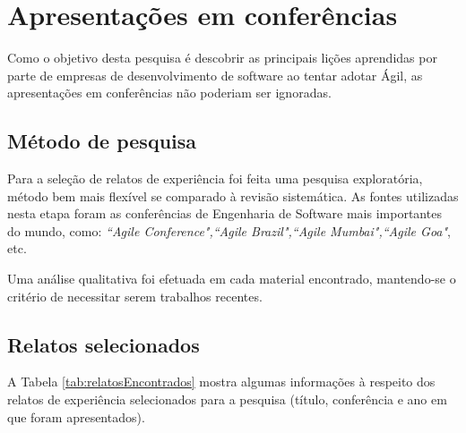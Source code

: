 %
%

\section{Apresentações em conferências}

Como o objetivo desta pesquisa é descobrir as principais lições aprendidas por parte de empresas de desenvolvimento de software ao tentar adotar Ágil, as apresentações em conferências não poderiam ser ignoradas.

\subsection{Método de pesquisa}

Para a seleção de relatos de experiência foi feita uma pesquisa exploratória, método bem mais flexível se comparado à revisão sistemática. As fontes utilizadas nesta etapa foram as conferências de Engenharia de Software mais importantes do mundo, como: \textit{``Agile Conference",``Agile Brazil",``Agile Mumbai",``Agile Goa"}, etc.

Uma análise qualitativa foi efetuada em cada material encontrado, mantendo-se o critério de necessitar serem trabalhos recentes.

\subsection{Relatos selecionados}

A Tabela \ref{tab:relatosEncontrados} mostra algumas informações à respeito dos relatos de experiência selecionados para a pesquisa (título, conferência e ano em que foram apresentados).

